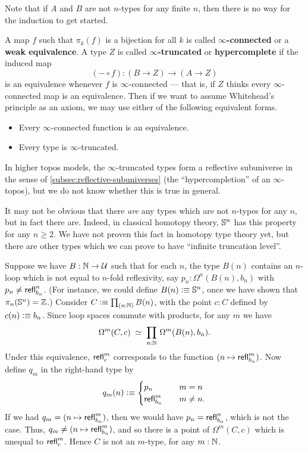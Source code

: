 Note that if $A$ and $B$ are not $n$-types for any finite $n$, then there is no way for the induction to get started.

A map $f$ such that $\pi_k(f)$ is a bijection for all $k$ is called \textbf{$\infty$-connected} or a \textbf{weak equivalence}.
A type $Z$ is called \textbf{$\infty$-truncated} or \textbf{hypercomplete} if the induced map
\[(-\circ f):(B\to Z) \to (A\to Z)\]
is an equivalence whenever $f$ is $\infty$-connected --- that is, if $Z$ thinks every $\infty$-connected map is an equivalence.
Then if we want to assume Whitehead's principle as an axiom, we may use either of the following equivalent forms.
\begin{itemize}
\item Every $\infty$-connected function is an equivalence.
\item Every type is $\infty$-truncated.
\end{itemize}
In higher topos models, the $\infty$-truncated types form a reflective subuniverse in the sense of \autoref{subsec:reflective-subuniverses} (the ``hypercompletion'' of an $\infty$-topos), but we do not know whether this is true in general.

It may not be obvious that there \emph{are} any types which are not $n$-types for any $n$, but in fact there are.
Indeed, in classical homotopy theory, $\mathbb{S}^n$ has this property for any $n\ge 2$.
We have not proven this fact in homotopy type theory yet, but there are other types which we can prove to have ``infinite truncation level''.

\begin{eg}
  Suppose we have $B:\mathbb{N}\to\mathcal{U}$ such that for each $n$, the type $B(n)$ contains an $n$-loop which is not equal to $n$-fold reflexivity, say $p_n:\Omega^n(B(n),b_n)$ with $p_n \neq \mathsf{refl}_{b_n}^n$.
  (For instance, we could define $B(n)\vcentcolon\equiv \mathbb{S}^n$, once we have shown that $\pi_n(\mathbb{S}^n)=\mathbb{Z}$.)
  Consider $C\defeq \prd{n:\nat} B(n)$, with the point $c:C$ defined by $c(n)\vcentcolon\equiv b_n$.
  Since loop spaces commute with products, for any $m$ we have
  \[\eqvspaced{\Omega^m (C,c)}{\prd{n:\nat}\Omega^m(B(n),b_n)}.\]
  Under this equivalence, $\mathsf{refl}_{c}^m$ corresponds to the function $(n\mapsto \mathsf{refl}_{b_n}^m)$.
  Now define $q_m$ in the right-hand type by
  \[ q_m(n) \vcentcolon\equiv
  \begin{cases}
    p_n &\quad m=n\\
    \mathsf{refl}_{b_n}^m &\quad m\neq n.
  \end{cases}
  \]
  If we had $q_m = (n\mapsto \mathsf{refl}_{b_n}^m)$, then we would have $p_n = \mathsf{refl}_{b_n}^n$, which is not the case.
  Thus, $q_m \neq (n\mapsto \mathsf{refl}_{b_n}^m)$, and so there is a point of $\Omega^m(C,c)$ which is unequal to $\mathsf{refl}_{c}^m$.
  Hence $C$ is not an $m$-type, for any $m:\mathbb{N}$.
\end{eg}


